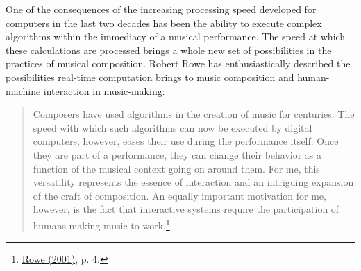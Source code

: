 One of the consequences of the increasing processing speed developed for computers in the last two decades has been the ability to execute complex algorithms within the immediacy of a musical performance. The speed at which these calculations are processed brings a whole new set of possibilities in the practices of musical composition. Robert Rowe has enthusiastically described the possibilities real-time computation brings to music composition and human-machine interaction in music-making:
\begin{quote}
Composers have used algorithms in the creation of music for centuries. The speed with which such algorithms can now be executed by digital computers, however, eases their use during the performance itself. Once they are part of a performance, they can change their behavior as a function of the musical context going on around them. For me, this versatility represents the essence of interaction and an intriguing expansion of the craft of composition. An equally important motivation for me, however, is the fact that interactive systems require the participation of humans making music to work.\footnote{\hyperlink{rowe}{Rowe (2001)}, p. 4.}
\end{quote}
